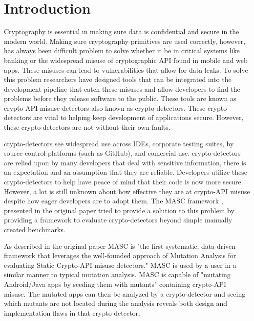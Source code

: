 \chapter{Introduction}
\label{chap_intro}


Cryptography is essential in making sure data is confidential and secure in the modern world. Making sure cryptography primitives are used correctly, however, has always been difficult problem to solve whether it be in critical systems like banking or the widespread misuse of cryptographic API found in mobile and web apps. These misuses can lead to vulnerabilities that allow for data leaks. To solve this problem researchers have designed tools that can be integrated into the development pipeline that catch these misuses and allow developers to find the problems before they release software to the public. These tools are known as crypto-API misuse detectors also known as crypto-detectors. These crypto-detectors are vital to helping keep development of applications secure. However, these crypto-detectors are not without their own faults.

crypto-detectors see widespread use across IDEs, corporate testing suites, by source control platforms (such as GitHub), and comercial use. crypto-detectors are relied upon by many developers that deal with sensitive information, there is an expectation and an assumption that they are reliable. Developers utilize these crypto-detectors to help have peace of mind that their code is now more secure. However, a lot is still unknown about how effective they are at crypto-API misuse despite how eager developers are to adopt them. The MASC framework \cite{Ami_2022}, presented in the original paper tried to provide a solution to this problem by providing a framework to evaluate crypto-detectors beyond simple manually created benchmarks.

As described in the original paper MASC is "the first systematic, data-driven framework that leverages the well-founded approach of Mutation Analysis for evaluating Static Crypto-API misuse detectors." MASC is used by a user in a similar manner to typical mutation analysis. MASC is capable of "mutating Android/Java apps by seeding them with mutants" containing crypto-API misuse. The mutated apps can then be analyzed by a crypto-detector and seeing which mutants are not located during the analysis reveals both design and implementation flaws in that crypto-detector.

